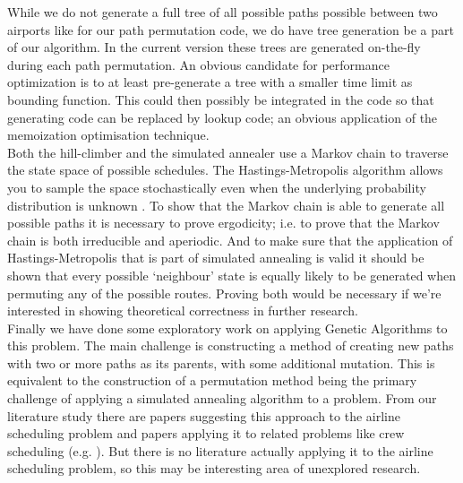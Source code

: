 \documentclass[journal]{IEEEtran}
\begin{document}
While we do not generate a full tree of all possible paths possible between two airports like \cite{Mashford2001} for our path permutation code, we do have tree generation be a part of our algorithm. In the current version these trees are generated on-the-fly during each path permutation. An obvious candidate for performance optimization is to at least pre-generate a tree with a smaller time limit as bounding function. This could then possibly be integrated in the code so that generating code can be replaced by lookup code; an obvious application of the memoization optimisation technique. \\
Both the hill-climber and the simulated annealer use a Markov chain to traverse the state space of possible schedules. The Hastings-Metropolis algorithm allows you to sample the space stochastically even when the underlying probability distribution is unknown \cite{Hasting1970}. To show that the Markov chain is able to generate all possible paths it is necessary to prove ergodicity; i.e. to prove that the Markov chain is both irreducible and aperiodic. And to make sure that the application of Hastings-Metropolis that is part of simulated annealing is valid it should be shown that every possible `neighbour' state is equally likely to be generated when permuting any of the possible routes. Proving both would be necessary if we're interested in showing theoretical correctness in further research. \\
Finally we have done some exploratory work on applying Genetic Algorithms to this problem. The main challenge is constructing a method of creating new paths with two or more paths as its parents, with some additional mutation. This is equivalent to the construction of a permutation method being the primary challenge of applying a simulated annealing algorithm to a problem. From our literature study there are papers suggesting this approach to the airline scheduling problem and papers applying it to related problems like crew scheduling  (e.g. \cite{Levine1996}). But there is no literature actually applying it to the airline scheduling problem, so this may be interesting area of unexplored research.



\end{document}
